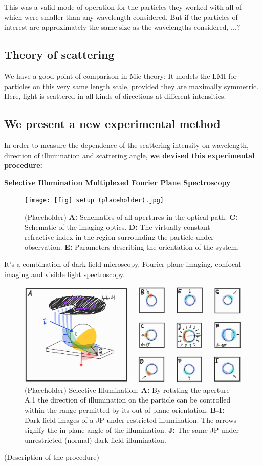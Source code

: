 \documentclass[10pt]{article}
\begin{document}
This was a valid mode of operation for the particles they worked with all of which were smaller than any wavelength considered. 
But if the particles of interest are approximately the same size as the wavelengths considered, ...? 

\subsection*{Theory of scattering}
We have a good point of comparison in Mie theory: 
It models the LMI for particles on this very same length scale, provided they are maximally symmetric. 
Here, light is scattered in all kinds of directions at different intensities.

\subsection*{We present a new experimental method}
In order to measure the dependence of the scattering intensity on wavelength, direction of illumination and scattering angle, \textbf{we devised this experimental procedure:}

\textbf{Selective Illumination Multiplexed Fourier Plane Spectroscopy}
\begin{figure}[h!]
    \centering
    \texttt{[image: [fig] setup (placeholder).jpg]}
    \caption{(Placeholder) 
    {\sffamily\bfseries A:} Schematics of all apertures in the optical path. 
    {\sffamily\bfseries C:} Schematic of the imaging optics. 
    {\sffamily\bfseries D:} The virtually constant refractive index in the region surrounding the particle under observation. 
    {\sffamily\bfseries E:} Parameters describing the orientation of the system.
    }
    \label{fig:setup}
\end{figure}

It's a combination of dark-field microscopy, Fourier plane imaging, confocal imaging and visible light spectroscopy. 
\begin{figure}[h!]
    \centering
    \includegraphics[width=\textwidth]{[fig] selective illumination}
    \caption{(Placeholder) Selective Illumination:   
    {\sffamily\bfseries A:} By rotating the aperture A.1 the direction of illumination on the particle can be controlled within the range permitted by its out-of-plane orientation. 
    {\sffamily\bfseries B-I:} Dark-field images of a JP under restricted illumination. 
    The arrows signify the in-plane angle of the illumination.  
    {\sffamily\bfseries J:} The same JP under unrestricted (normal) dark-field illumination. 
    }
    \label{fig:selective-illumination}
\end{figure}
(Description of the procedure)
\end{document}
